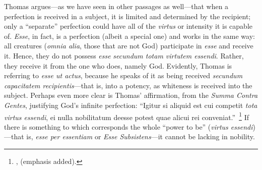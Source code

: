 %
Thomas argues---as we have seen in other passages as well---that when a perfection is received in a subject, it is limited and determined by the recipient; only a ``separate'' perfection could have all of the \emph{virtus} or intensity  it is capable of. \emph{Esse}, in fact, is a perfection (albeit a special one) and works in the same way: all creatures (\emph{omnia alia}, those that are not God) participate in \emph{esse} and receive it. Hence, they do not possess \emph{esse} \emph{secundum totam virtutem essendi}. Rather, they receive it from the one who does, namely God. Evidently, Thomas is referring to \emph{esse ut actus}, because he speaks of it as being received \emph{secundum capacitatem recipientis}---that is, into a potency, as whiteness is received into the subject. Perhaps even more clear is Thomas' affirmation, from the \emph{Summa Contra Gentes}, justifying God's infinite perfection: ``Igitur si aliquid est cui competit \emph{tota virtus essendi}, ei nulla nobilitatum deesse potest quae alicui rei conveniat.''\,%
%
\footnote{\Cite[I, cap.~28, n.~2 (Marietti n.~260)]{st:contragent}, (emphasis added).} If there is something to which corresponds the whole ``power to be'' (\emph{virtus essendi})---that is, \emph{esse per essentiam} or \emph{Esse Subsistens}---it cannot be lacking in nobility.

